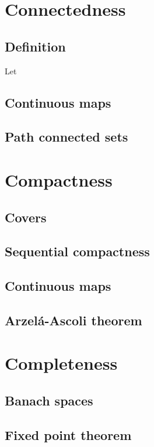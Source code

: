 \documentclass[../Year2.tex]{subfiles}
\begin{document}
\section{Connectedness}

\subsection{Definition}

\begin{definition}
    Let 
\end{definition}

\subsection{Continuous maps}

\subsection{Path connected sets}

\section{Compactness}

\subsection{Covers}

\subsection{Sequential compactness}

\subsection{Continuous maps}

\subsection{Arzelá-Ascoli theorem}

\section{Completeness}

\subsection{Banach spaces}

\subsection{Fixed point theorem}
\end{document}
